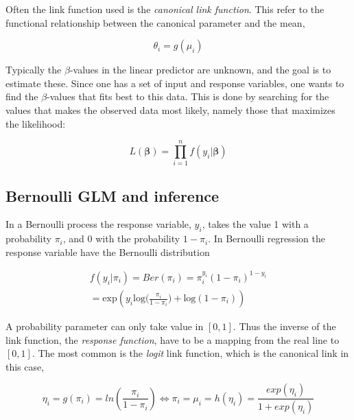 
Often the link function used is the \textit{canonical link function}. This refer to the functional relationship between the canonical parameter and the mean,

\begin{equation}
\theta_i = g(\mu_i)
\end{equation}



Typically the $\beta$-values in the linear predictor are unknown, and the goal is to estimate these. Since one has a set of input and response variables, one wants to find the $\beta$-values that fits best to this data. This is done by searching for the values that makes the observed data most likely, namely those that maximizes the likelihood:

\begin{equation}
    L(\bm{\beta}) = \prod_{i=1}^{n} f(y_i |\bm{ \beta})
\end{equation}

\subsection{Bernoulli GLM and inference}
In a Bernoulli process the response variable, $y_i$, takes the value 1 with a probability $\pi_i$, and 0 with the probability $1-\pi_i$. In Bernoulli regression the response variable have the Bernoulli distribution

\begin{equation}
\begin{split}
    f(y_i|\pi_i) = Ber(\pi_i) = \pi_i^{y_i}(1-\pi_i)^{1-y_i}\\
    = \text{exp} ( y_i  \text{log}\big(\frac{\pi_i}{1-\pi_i}\big) + \text{log}(1-\pi_i))
\end{split}
\end{equation}

A probability parameter can only take value in $[0,1]$. Thus the inverse of the link function, the \textit{response function}, have to be a mapping from the real line to $[0,1]$. The most common is the \textit{logit} link function, which is the canonical link in this case,

\begin{equation}
    \eta_i = g(\pi_i) = ln(\frac{\pi_i}{1-\pi_i}) \Leftrightarrow 
    \pi_i = \mu_i = h(\eta_i) = \frac{exp(\eta_i)}{1+exp(\eta_i)}
\end{equation}

